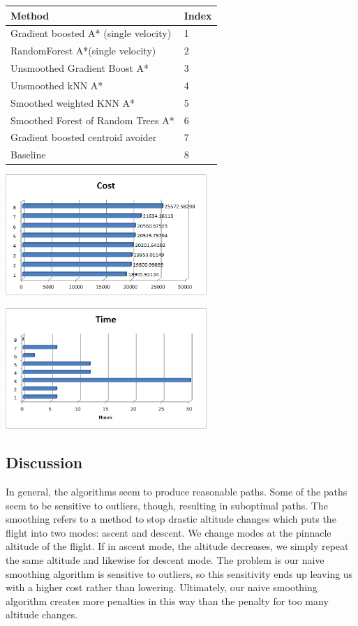 \documentclass{article}[12pt]
\begin{document}
\begin{multicols}{2}
\begingroup
\noindent
\begin{tabular}{ | l | l | }
    \hline
    Method & Index \\ \hline
    Gradient boosted A* (single velocity) & 1\\ \hline
		RandomForest A*(single velocity) & 2 \\ \hline
		Unsmoothed Gradient Boost A* & 3 \\ \hline
		Unsmoothed kNN A* & 4 \\ \hline
		Smoothed weighted KNN A* & 5 \\ \hline
		Smoothed Forest of Random Trees A* & 6 \\ \hline
		Gradient boosted centroid avoider & 7\\ \hline
		Baseline & 8 \\ \hline
\end{tabular}
\begin{center}
    \includegraphics[width=3in]{results.png}
	\end{center}
\begin{center}
    \includegraphics[width=3in]{time.png}
	\end{center}
\endgroup

\subsection{Discussion}
In general, the algorithms seem to produce reasonable paths. Some of the paths seem to be sensitive to outliers, though, resulting in suboptimal paths. The smoothing refers to a method to stop drastic altitude changes which puts the flight into two modes: ascent and descent. We change modes at the pinnacle altitude of the flight. If in ascent mode, the altitude decreases, we simply repeat the same altitude and likewise for descent mode. The problem is our naive smoothing algorithm is sensitive to outliers, so this sensitivity ends up leaving us with a higher cost rather than lowering. Ultimately, our naive smoothing algorithm creates more penalties in this way than the penalty for too many altitude changes. \\


\end{multicols}
\end{document}
